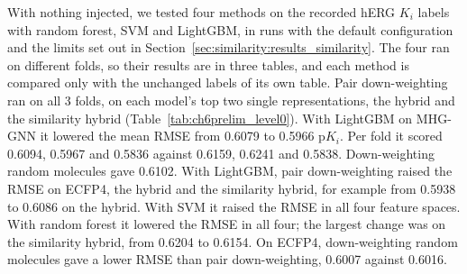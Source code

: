 With nothing injected, we tested four methods on the recorded hERG $K_i$ labels with random forest, SVM and LightGBM, in runs with the default configuration and the limits set out in Section~\ref{sec:similarity:results_similarity}. The four ran on different folds, so their results are in three tables, and each method is compared only with the unchanged labels of its own table. Pair down-weighting ran on all 3 folds, on each model's top two single representations, the hybrid and the similarity hybrid (Table~\ref{tab:ch6prelim_level0}). With LightGBM on MHG-GNN it lowered the mean RMSE from 0.6079 to 0.5966 p$K_i$. Per fold it scored 0.6094, 0.5967 and 0.5836 against 0.6159, 0.6241 and 0.5838. Down-weighting random molecules gave 0.6102. With LightGBM, pair down-weighting raised the RMSE on ECFP4, the hybrid and the similarity hybrid, for example from 0.5938 to 0.6086 on the hybrid. With SVM it raised the RMSE in all four feature spaces. With random forest it lowered the RMSE in all four; the largest change was on the similarity hybrid, from 0.6204 to 0.6154. On ECFP4, down-weighting random molecules gave a lower RMSE than pair down-weighting, 0.6007 against 0.6016.

